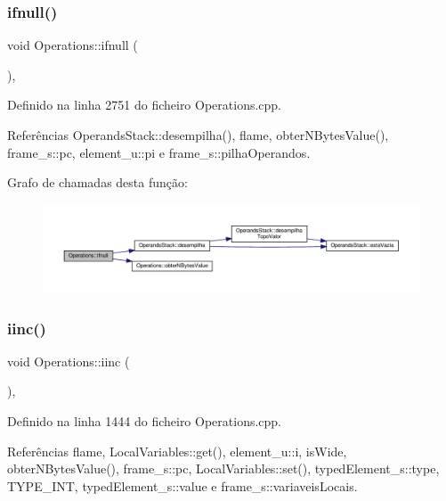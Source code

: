 \subsubsection{\texorpdfstring{ifnull()}{ifnull()}}
{\footnotesize\ttfamily void Operations\+::ifnull (\begin{DoxyParamCaption}{ }\end{DoxyParamCaption})\hspace{0.3cm}{\ttfamily [static]}, {\ttfamily [private]}}



Definido na linha 2751 do ficheiro Operations.\+cpp.



Referências Operands\+Stack\+::desempilha(), flame, obter\+N\+Bytes\+Value(), frame\+\_\+s\+::pc, element\+\_\+u\+::pi e frame\+\_\+s\+::pilha\+Operandos.

Grafo de chamadas desta função\+:
\nopagebreak
\begin{figure}[H]
\begin{center}
\leavevmode
\includegraphics[width=350pt]{classOperations_a030f5995f8f357254e543d0cbce2d189_cgraph}
\end{center}
\end{figure}
\mbox{\label{classOperations_a9934f9369192b10a978c7d6950592c42}} 
\subsubsection{\texorpdfstring{iinc()}{iinc()}}
{\footnotesize\ttfamily void Operations\+::iinc (\begin{DoxyParamCaption}{ }\end{DoxyParamCaption})\hspace{0.3cm}{\ttfamily [static]}, {\ttfamily [private]}}



Definido na linha 1444 do ficheiro Operations.\+cpp.



Referências flame, Local\+Variables\+::get(), element\+\_\+u\+::i, is\+Wide, obter\+N\+Bytes\+Value(), frame\+\_\+s\+::pc, Local\+Variables\+::set(), typed\+Element\+\_\+s\+::type, T\+Y\+P\+E\+\_\+\+I\+NT, typed\+Element\+\_\+s\+::value e frame\+\_\+s\+::variaveis\+Locais.

